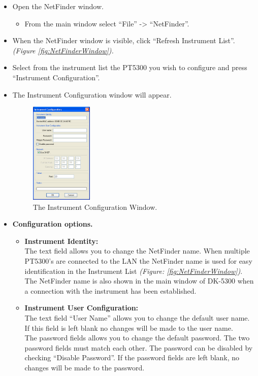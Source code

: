 \begin{itemize}
\item Open the NetFinder window.
	\begin{itemize}
		\item From the main window select ``File'' -> ``NetFinder''.
	\end{itemize}
\item When the NetFinder window is visible, click ``Refresh Instrument List''. \textit{(Figure \ref{fig:NetFinderWindow}).}
\item Select from the instrument list the PT5300 you wish to configure and press ``Instrument Configuration''.
\item The Instrument Configuration window will appear.

\begin{figure}[hbt]
\centering
\includegraphics[width=0.28\textwidth]{fig/NetFinder_Config}
\caption{The Instrument Configuration Window.\label{fig:NetFinderConfigWindow}}
\end{figure}
\item	\textbf{Configuration options.}\\
	\begin{itemize}
		\item \textbf{Instrument Identity:}\\The text field allows you to change the NetFinder name. When multiple PT5300's are connected to the LAN the NetFinder name is used for easy identification in the Instrument List \textit{(Figure: \ref{fig:NetFinderWindow})}.\\The NetFinder name is also shown in the main window of DK-5300 when a connection with the instrument has been established.
		\item \textbf{Instrument User Configuration:}\\The text field ``User Name'' allows you to change the default user name. If this field is left blank no changes will be made to the user name.\\The password fields allows you to change the default password. The two password fields must match each other. The password can be disabled by checking ``Disable Password''. If the password fields are left blank, no changes will be made to the password.

\end{itemize}
\end{itemize}
